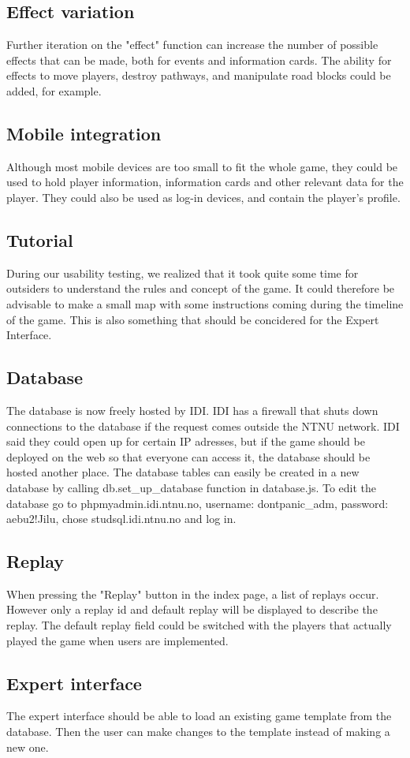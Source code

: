 \subsection{Effect variation}
Further iteration on the "effect" function can increase the number of possible effects that can be made, both for events and information cards. The ability for effects to move players, destroy pathways, and manipulate road blocks could be added, for example.\\

\subsection{Mobile integration}
Although most mobile devices are too small to fit the whole game, they could be used to hold player information, information cards and other relevant data for the player. They could also be used as log-in devices, and contain the player's profile.

\subsection{Tutorial} 
During our usability testing, we realized that it took quite some time for outsiders to understand the rules and concept of the game. It could therefore be advisable to make a small map with some instructions coming during the timeline of the game. This is also something that should be concidered for the Expert Interface. 

\subsection{Database}
The database is now freely hosted by IDI. IDI has a firewall that shuts down connections to the database if the request comes outside the NTNU network. IDI said they could open up for certain IP adresses, but if the game should be deployed on the web so that everyone can access it, the database should be hosted another place. The database tables can easily be created in a new database by calling db.set\_up\_database function in database.js. To edit the database go to phpmyadmin.idi.ntnu.no, username: dontpanic\_adm, password: aebu2!Jilu, chose studsql.idi.ntnu.no and log in.

\subsection{Replay}
When pressing the "Replay" button in the index page, a list of replays occur. However only a replay id and default replay will be displayed to describe the replay. The default replay field could be switched with the players that actually played the game when users are implemented. \\

\subsection{Expert interface}
The expert interface should be able to load an existing game template from the database. Then the user can make changes to the template instead of making a new one.

